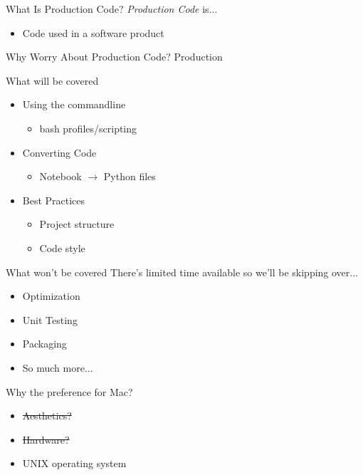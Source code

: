 \documentclass[12pt,t]{beamer}
\begin{document}
\begin{frame}{What Is Production Code?}
	\emph{Production Code} is...
	\begin{itemize}
		\item Code used in a software product
	\end{itemize}
\end{frame}

\begin{frame}{Why Worry About Production Code?}
	Production
\end{frame}

\begin{frame}{What will be covered}
	\begin{itemize}
		\item Using the commandline
		\begin{itemize}
			\item bash profiles/scripting
		\end{itemize}
		\item Converting Code
		\begin{itemize}
			\item Notebook $\to$ Python files
		\end{itemize}
		\item Best Practices
		\begin{itemize}
			\item Project structure
			\item Code style
		\end{itemize}
	\end{itemize}
\end{frame}

\begin{frame}{What won't be covered}
	There's limited time available so we'll be skipping over...
    \begin{itemize}
	    \item Optimization
	    \item Unit Testing
		\item Packaging
		\item So much more...
	\end{itemize}
\end{frame}

\begin{frame}{Why the preference for Mac?}
	\begin{itemize}
		\item \sout{Aesthetics?}
		\item \sout{Hardware?}
		\item UNIX operating system
	\end{itemize}
\end{frame}
\end{document}
